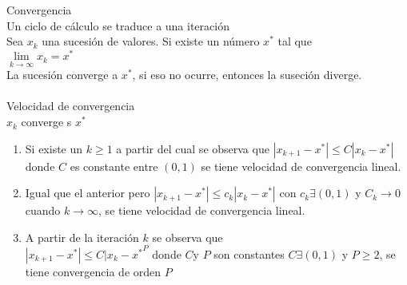\\ \\
Convergencia\\
Un ciclo de c\'alculo se traduce a una iteraci\'on 
\\
Sea $x_k$ una sucesión de valores. Si existe un n\'umero $x^*$ tal que\\
$\lim\limits_{k\to\infty}x_k=x^*$ \\
La sucesi\'on converge a $x^*$, si eso no ocurre, entonces la suseci\'on diverge.
\\ \\ 
Velocidad de convergencia\\ 
${x_k}$ converge s $x^*$ \\
\begin{enumerate}
\item Si existe un $k\geq 1$ a partir del cual se observa que $|x_{k+1}-x^*|\leq C|x_k-x^*|$ donde $C$ es constante entre $(0,1)$ se tiene velocidad de convergencia lineal.
\item Igual que el anterior pero $|x_{k+1}-x^*|\leq c_k|x_k-x^*|$ con $c_k\exists(0,1)$ y $C_k\to0$ cuando $k\to\infty$, se tiene  velocidad de convergencia lineal.
\item A partir de la iteraci\'on $k$ se observa que\\
$|x_{k+1}-x^*|\leq C{|x_k-x^*}^P$ donde $C$y $P$ son constantes $C\exists(0,1)$ y $P\geq2$, se tiene convergencia de orden $P$
\end{enumerate}
